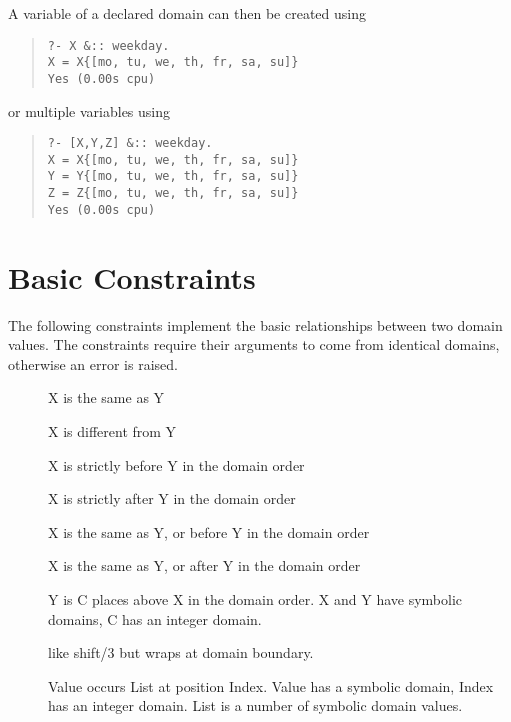 A variable of a declared domain can then be created using
\begin{quote}\begin{verbatim}
?- X &:: weekday.
X = X{[mo, tu, we, th, fr, sa, su]}
Yes (0.00s cpu)
\end{verbatim}\end{quote}
or multiple variables using
\begin{quote}\begin{verbatim}
?- [X,Y,Z] &:: weekday.
X = X{[mo, tu, we, th, fr, sa, su]}
Y = Y{[mo, tu, we, th, fr, sa, su]}
Z = Z{[mo, tu, we, th, fr, sa, su]}
Yes (0.00s cpu)
\end{verbatim}\end{quote}


\section{Basic Constraints}
The following constraints implement the basic relationships between
two domain values.  The constraints require their arguments to come
from identical domains, otherwise an error is raised.
\begin{description}
\item[]
    X is the same as Y
\item[]
    X is different from Y
\item[]
    X is strictly before Y in the domain order
\item[]
    X is strictly after Y in the domain order
\item[]
    X is the same as Y, or before Y in the domain order
\item[]
    X is the same as Y, or after Y in the domain order
\item[]
    Y is C places above X in the domain order.
    X and Y have symbolic domains, C has an integer domain.
\item[]
    like shift/3 but wraps at domain boundary.
\item[]
    Value occurs List at position Index.
    Value has a symbolic domain, Index has an integer domain.
    List is a number of symbolic domain values.
\end{description}
